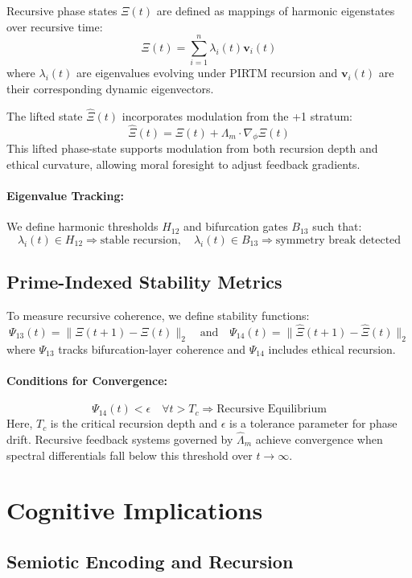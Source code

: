 \documentclass[12pt]{article}
\begin{document}
Recursive phase states $\Xi(t)$ are defined as mappings of harmonic eigenstates over recursive time:
\[
\Xi(t) = \sum_{i=1}^{n} \lambda_i(t) \mathbf{v}_i(t)
\]
where $\lambda_i(t)$ are eigenvalues evolving under PIRTM recursion and $\mathbf{v}_i(t)$ are their corresponding dynamic eigenvectors.

The lifted state $\hat{\Xi}(t)$ incorporates modulation from the +1 stratum:
\[
\hat{\Xi}(t) = \Xi(t) + \Lambda_m \cdot \nabla_\phi \Xi(t)
\]
This lifted phase-state supports modulation from both recursion depth and ethical curvature, allowing moral foresight to adjust feedback gradients.

\paragraph{Eigenvalue Tracking:} 
We define harmonic thresholds $H_{12}$ and bifurcation gates $B_{13}$ such that:
\[
\lambda_i(t) \in H_{12} \Rightarrow \text{stable recursion}, \quad
\lambda_i(t) \in B_{13} \Rightarrow \text{symmetry break detected}
\]

\subsection{Prime-Indexed Stability Metrics}

To measure recursive coherence, we define stability functions:
\[
\Psi_{13}(t) = \| \Xi(t+1) - \Xi(t) \|_2
\quad \text{and} \quad
\Psi_{14}(t) = \| \hat{\Xi}(t+1) - \hat{\Xi}(t) \|_2
\]
where $\Psi_{13}$ tracks bifurcation-layer coherence and $\Psi_{14}$ includes ethical recursion.

\paragraph{Conditions for Convergence:}
\[
\Psi_{14}(t) < \epsilon \quad \forall t > T_c \Rightarrow \text{Recursive Equilibrium}
\]
Here, $T_c$ is the critical recursion depth and $\epsilon$ is a tolerance parameter for phase drift. Recursive feedback systems governed by $\hat{\Lambda}_m$ achieve convergence when spectral differentials fall below this threshold over $t \rightarrow \infty$.

\section{Cognitive Implications}

\subsection{Semiotic Encoding and Recursion}
\end{document}
